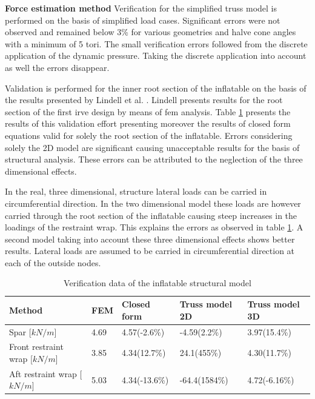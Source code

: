 \textbf{Force estimation method}
Verification for the simplified truss model is performed on the basis of simplified load cases. Significant errors were not observed and remained below 3\% for various geometries and halve cone angles with a minimum of 5 tori. The small verification errors followed from the discrete application of the dynamic pressure. Taking the discrete application into account as well the errors disappear.

Validation is performed for the inner root section of the inflatable on the basis of the results presented by Lindell et al. \cite{Lindell2006}. Lindell presents results for the root section of the first \gls{irve} design by means of \gls{fem} analysis. Table \ref{tab:struc_val} presents the results of this validation effort presenting moreover the results of closed form equations valid for solely the root section of the inflatable. Errors considering solely the 2D model are significant causing unacceptable results for the basis of structural analysis. These errors can be attributed to the neglection of the three dimensional effects. 

In the real, three dimensional, structure lateral loads can be carried in circumferential direction. In the two dimensional model these loads are however carried through the root section of the inflatable causing steep increases in the loadings of the restraint wrap. This explains the errors as observed in table \ref{tab:struc_val}. A second model taking into account these three dimensional effects shows better results. Lateral loads are assumed to be carried in circumferential direction at each of the outside nodes. 

\begin{table}[h]
\centering
\caption{Verification data of the inflatable structural model}
\label{tab:struc_val} 
\begin{tabular}{|l|l|l|l|l|} \hline
Method                            & FEM \cite{Lindell2006} & Closed form \cite{Lindell2006} & Truss model 2D & Truss model 3D \\ \hline \hline
Spar [$kN/m$]                 & 4.69                     & 4.57(-2.6\%)                     & -4.59(2.2\%)   & 3.97(15.4\%)   \\ \hline
Front restraint wrap [$kN/m$] & 3.85                     & 4.34(12.7\%)                     & 24.1(455\%)    & 4.30(11.7\%)   \\ \hline
Aft restraint wrap [$kN/m$]   & 5.03                     & 4.34(-13.6\%)                    & -64.4(1584\%)  & 4.72(-6.16\%) \\ \hline
\end{tabular}
\end{table}

